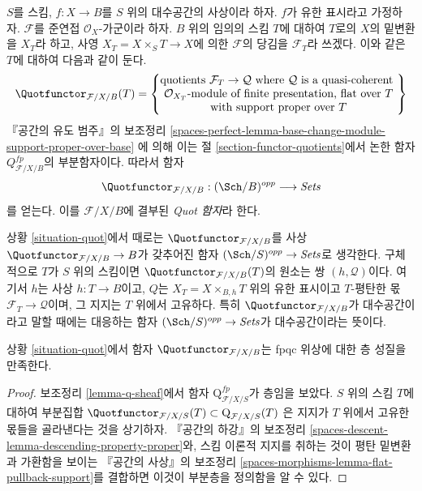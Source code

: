 \begin{situation}
\label{situation-quot}
$S$를 스킴, $f : X \to B$를 $S$ 위의 대수공간의 사상이라 하자.
$f$가 유한 표시라고 가정하자. $\mathcal{F}$를 준연접
$\mathcal{O}_X$-가군이라 하자. $B$ 위의 임의의 스킴 $T$에 대하여
$T$로의 $X$의 밑변환을 $X_T$라 하고, 사영
$X_T = X \times_S T \to X$에 의한 $\mathcal{F}$의 당김을
$\mathcal{F}_T$라 쓰겠다. 이와 같은 $T$에 대하여 다음과 같이 둔다.
$$
\Quotfunctor_{\mathcal{F}/X/B}(T) =
\left\{
\begin{matrix}
\text{quotients }\mathcal{F}_T \to \mathcal{Q}\text{ where }
\mathcal{Q}\text{ is a quasi-coherent }\\
\mathcal{O}_{X_T}\text{-module of finite presentation, flat over }T\\
\text{with support proper over }T
\end{matrix}
\right\}
$$
『공간의 유도 범주』의 보조정리
\ref{spaces-perfect-lemma-base-change-module-support-proper-over-base}
에 의해 이는 절 \ref{section-functor-quotients}에서 논한 함자
$Q^{fp}_{\mathcal{F}/X/B}$의 부분함자이다. 따라서 함자
\begin{equation}
\label{equation-quot}
\Quotfunctor_{\mathcal{F}/X/B} : (\Sch/B)^{opp} \longrightarrow \textit{Sets}
\end{equation}
를 얻는다. 이를 $\mathcal{F}/X/B$에 결부된 {\it Quot 함자}라 한다.
\end{situation}

\noindent
상황 \ref{situation-quot}에서 때로는 $\Quotfunctor_{\mathcal{F}/X/B}$를
사상 $\Quotfunctor_{\mathcal{F}/X/B} \to B$가 갖추어진 함자
$(\Sch/S)^{opp} \to \textit{Sets}$로 생각한다. 구체적으로 $T$가
$S$ 위의 스킴이면 $\Quotfunctor_{\mathcal{F}/X/B}(T)$의 원소는 쌍
$(h, \mathcal{Q})$이다. 여기서 $h$는 사상 $h : T \to B$이고,
$Q$는 $X_T = X \times_{B, h} T$ 위의 유한 표시이고 $T$-평탄한 몫
$\mathcal{F}_T \to \mathcal{Q}$이며, 그 지지는 $T$ 위에서 고유하다.
특히 $\Quotfunctor_{\mathcal{F}/X/B}$가 대수공간이라고 말할 때에는
대응하는 함자 $(\Sch/S)^{opp} \to \textit{Sets}$가 대수공간이라는 뜻이다.

\begin{lemma}
\label{lemma-quot-sheaf}
상황 \ref{situation-quot}에서 함자 $\Quotfunctor_{\mathcal{F}/X/B}$는
fpqc 위상에 대한 층 성질을 만족한다.
\end{lemma}

\begin{proof}
보조정리 \ref{lemma-q-sheaf}에서 함자
$\text{Q}^{fp}_{\mathcal{F}/X/S}$가 층임을 보았다. $S$ 위의 스킴
$T$에 대하여 부분집합
$\Quotfunctor_{\mathcal{F}/X/S}(T) \subset \text{Q}_{\mathcal{F}/X/S}(T)$
은 지지가 $T$ 위에서 고유한 몫들을 골라낸다는 것을 상기하자.
『공간의 하강』의 보조정리
\ref{spaces-descent-lemma-descending-property-proper}와, 스킴 이론적 지지를
취하는 것이 평탄 밑변환과 가환함을 보이는 『공간의 사상』의 보조정리
\ref{spaces-morphisms-lemma-flat-pullback-support}를 결합하면
이것이 부분층을 정의함을 알 수 있다.
\end{proof}

